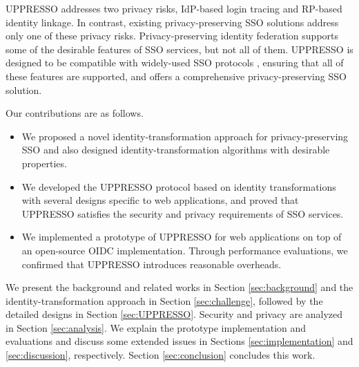 
UPPRESSO addresses two privacy risks, IdP-based login tracing and RP-based identity linkage. In contrast, existing privacy-preserving SSO solutions \cite{BrowserID, SPRESSO, NIST2017draft, FirefoxAccount} address only one of these privacy risks. Privacy-preserving identity federation \cite{PseudoID, ELPASSO, UnlimitID,Opaak,uprov,hyperledge-idemix} supports some of the desirable features of SSO services, but not all of them. UPPRESSO is designed to be compatible with widely-used SSO protocols \cite{OpenIDConnect, rfc6749, SAML, NIST2017draft}, ensuring that all of these features are supported, and offers a comprehensive privacy-preserving SSO solution.

Our contributions are as follows.
\vspace{-\topsep}\begin{itemize}
\setlength{\topsep}{0pt}
\setlength{\partopsep}{0pt}
\setlength{\itemsep}{0pt}
\setlength{\parsep}{0pt}
\setlength{\parskip}{0pt}
\item We proposed a novel identity-transformation approach for privacy-preserving SSO and also designed identity-transformation algorithms with desirable properties.
\item We developed the UPPRESSO protocol based on identity transformations    with several designs specific to web applications, and proved that UPPRESSO satisfies the security and privacy requirements of SSO services.
\item We implemented a prototype of UPPRESSO for web applications on top of an open-source OIDC implementation. Through performance evaluations, we confirmed that UPPRESSO introduces reasonable overheads.
\end{itemize}


We present the background and related works in Section \ref{sec:background} and the identity-transformation approach in Section \ref{sec:challenge}, followed by the detailed designs in Section \ref{sec:UPPRESSO}.
Security and privacy are analyzed in Section \ref{sec:analysis}.
 We explain the prototype implementation and evaluations
  and discuss some extended issues
    in Sections \ref{sec:implementation} and \ref{sec:discussion}, respectively.
Section \ref{sec:conclusion} concludes this work.
